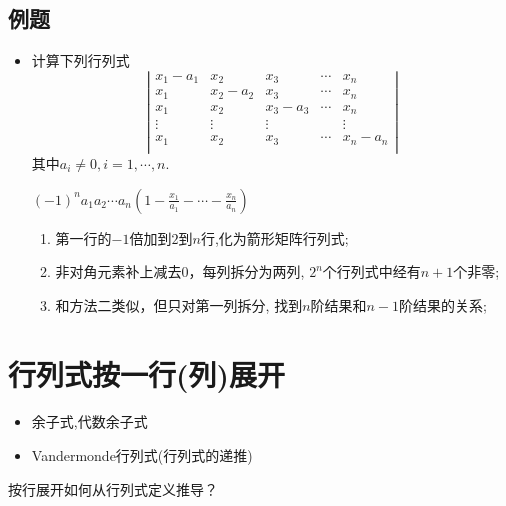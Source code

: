 \subsection*{例题}
\begin{itemize}
    \item 计算下列行列式
    \begin{equation}
    \nonumber
    \left|
        \begin{array}{ccccc}
        x_1-a_1 &x_2     &x_3     &\cdots & x_n\\
        x_1     &x_2-a_2 &x_3     &\cdots & x_n\\
        x_1     &x_2     &x_3-a_3 &\cdots & x_n\\
        \vdots  &\vdots  &\vdots  &       & \vdots\\
        x_1     &x_2     &x_3     &\cdots & x_n-a_n\\
        \end{array}
    \right|
    \end{equation} 
    其中$a_i \ne 0, i = 1,\cdots,n.$
    \begin{solution}
		$(-1)^na_1 a_2 \cdots a_n \left(1-\frac{x_1}{a_1} - \cdots - \frac{x_n}{a_n}\right)$
		\begin{enumerate}
			\item 第一行的$-1$倍加到$2$到$n$行,化为箭形矩阵行列式;
			\item 非对角元素补上减去$0$，每列拆分为两列, $2^n$个行列式中经有$n+1$个非零;
			\item 和方法二类似，但只对第一列拆分, 找到$n$阶结果和$n-1$阶结果的关系;
		\end{enumerate}
	\end{solution}
    \vspace{2cm}
\end{itemize}

\section{行列式按一行(列)展开}
\begin{itemize}
    \item 余子式,代数余子式
    \item Vandermonde行列式(行列式的递推)
\end{itemize}

\vspace{1em}
\begin{remark}
	按行展开如何从行列式定义推导？
\end{remark}

